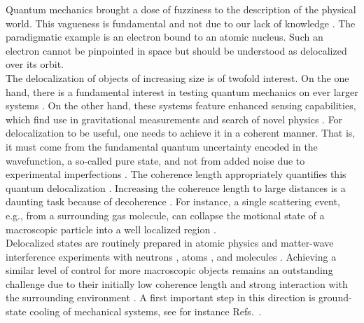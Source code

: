 \documentclass[aps,amssymb,amsmath,prl,superscriptaddress,reprint,noshowpacs]{revtex4-1}
\begin{document}
\maketitle
Quantum mechanics brought a dose of fuzziness to the description of the physical world. 
%
This vagueness is fundamental and not due to our lack of knowledge \cite{heisenberg_uber_1927}. 
%
The paradigmatic example is an electron bound to an atomic nucleus. Such an electron cannot be pinpointed in space but should be understood as delocalized over its orbit.
\\
The delocalization of objects of increasing size is of twofold interest.
%
On the one hand, there is a fundamental interest in testing quantum mechanics on ever larger systems \cite{ghirardi_unified_1986, romero-isart_quantum_2011, bassi_models_2013, arndt_testing_2014}.
%
On the other hand, these systems feature enhanced sensing capabilities, which find use in gravitational measurements \cite{westphal_measurement_2021, weiss_large_2021, cosco_enhanced_2021} and search of novel physics \cite{moore_searching_2021}.
%
For delocalization to be useful, one needs to achieve it in a coherent manner.
%
That is, it must come from the fundamental quantum uncertainty encoded in the wavefunction, a so-called pure state, and not from added noise due to experimental imperfections \cite{weiss_large_2021}.
%
The coherence length appropriately quantifies this quantum delocalization \cite{joos_emergence_1985, nairz_quantum_2003, schlosshauer_decoherence_2007, romero-isart_quantum_2011}.
%
Increasing the coherence length to large distances is a daunting task because of decoherence \cite{schlosshauer_decoherence_2007}.
%
For instance, a single scattering event, e.g., from a surrounding gas molecule, can collapse the motional state of a macroscopic particle into a well localized region \cite{uys_matter-wave_2005-1}.
\\
Delocalized states are routinely prepared in atomic physics \cite{meekhof_generation_1996, xin_rapid_2021} and matter-wave interference experiments with neutrons \cite{rauch_test_1974}, atoms \cite{keith_interferometer_1991}, and molecules \cite{fein_quantum_2019}. 
%
Achieving a similar level of control for more macroscopic objects remains an outstanding challenge due to their initially low coherence length and strong interaction with the surrounding environment \cite{aspelmeyer_cavity_2014,gonzalez-ballestero_levitodynamics_2021}. 
%
A first important step in this direction is ground-state cooling of mechanical systems, see for instance Refs.~\cite{chan_laser_2011, teufel_sideband_2011, rossi_measurement-based_2018, delic_cooling_2020, magrini_real-time_2021, tebbenjohanns_quantum_2021}.
\end{document}
